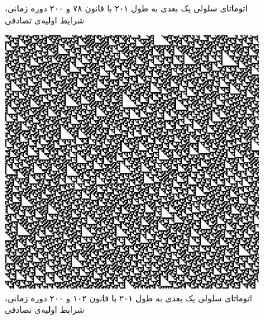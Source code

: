 \documentclass[11pt, a4paper]{article}
\begin{document}
\begin{figure}[!tbp]
\begin{minipage}[b]{0.3\textwidth}
    \caption{اتوماتای سلولی یک بعدی به طول ۲۰۱ با قانون ۷۸ و ۲۰۰ دوره زمانی، شرایط اولیه‌ی تصادفی}
    \label{fig:q3-78-rand}
  \end{minipage}
  \hfill
	\begin{minipage}[b]{0.3\textwidth}
	\includegraphics[width=\textwidth]{q3-102-rand}
    \caption{اتوماتای سلولی یک بعدی به طول ۲۰۱ با قانون ۱۰۲ و ۲۰۰ دوره زمانی، شرایط اولیه‌ی تصادفی}
	\label{fig:q3-102-rand}
  \end{minipage}
  \hfill
\end{figure}
\end{document}
